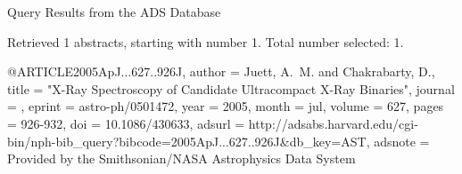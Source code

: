 Query Results from the ADS Database


Retrieved 1 abstracts, starting with number 1.  Total number selected: 1.

@ARTICLE{2005ApJ...627..926J,
   author = {{Juett}, A.~M. and {Chakrabarty}, D.},
    title = "{X-Ray Spectroscopy of Candidate Ultracompact X-Ray Binaries}",
  journal = {\apj},
   eprint = {astro-ph/0501472},
     year = 2005,
    month = jul,
   volume = 627,
    pages = {926-932},
      doi = {10.1086/430633},
   adsurl = {http://adsabs.harvard.edu/cgi-bin/nph-bib_query?bibcode=2005ApJ...627..926J&db_key=AST},
  adsnote = {Provided by the Smithsonian/NASA Astrophysics Data System}
}


